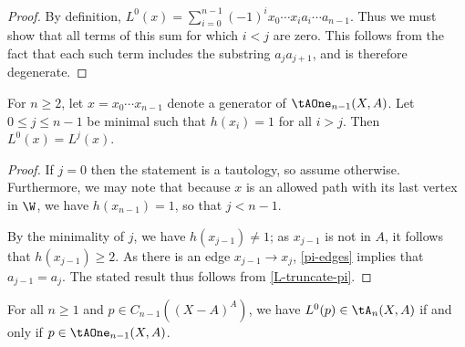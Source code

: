 \begin{proof}
By definition, $L^0(x) = \sum\limits_{i = 0}^{n-1} (-1)^i x_0 \cdots x_i a_i \cdots a_{n-1}$. Thus we must show that all terms of this sum for which $i < j$ are zero. This follows from the fact that each such term includes the substring $a_j a_{j+1}$, and is therefore degenerate.
\end{proof}

\begin{lemma}\label{L-truncate-minimal}
For $n \geq 2$, let $x = x_0 \cdots x_{n-1}$ denote a generator of $\tAOne_{n-1}(X,A)$. Let $0 \leq j \leq n-1$ be minimal such that $h(x_i) = 1$ for all $i > j$. Then $L^0(x) = L^j(x)$.
\end{lemma}

\begin{proof}
If $j = 0$ then the statement is a tautology, so assume otherwise.  Furthermore, we may note that because $x$ is an allowed path with its last vertex in $\W$, we have $h(x_{n-1}) = 1$, so that $j < n - 1$.

By the minimality of $j$, we have $h(x_{j-1}) \neq 1$; as $x_{j-1}$ is not in $A$, it follows that $h(x_{j-1}) \geq 2$. As there is an edge $x_{j-1} \to x_j$, \cref{pi-edges} implies that $a_{j-1} = a_j$. The stated result thus follows from \cref{L-truncate-pi}.
\end{proof}

\begin{lemma}\label{L-allowed}
For all $n \geq 1$ and $p \in C_{n-1}((X-A)^A)$, we have $L^0(p) \in \tA_{n}(X,A)$ if and only if $p \in \tAOne_{n-1}(X,A)$.
\end{lemma}

